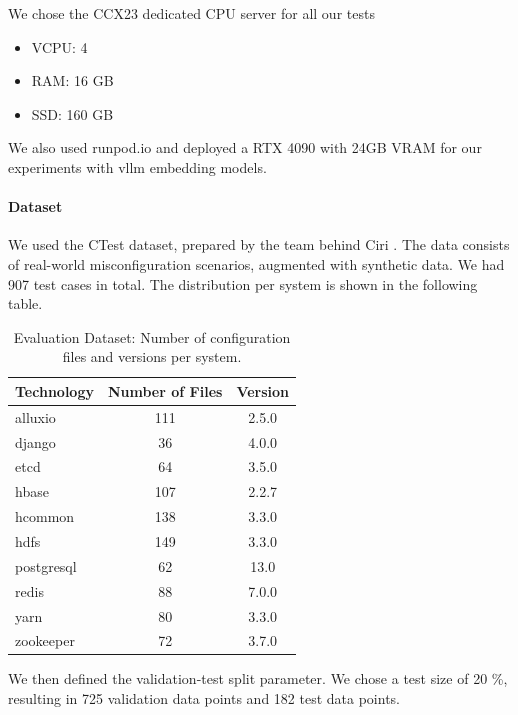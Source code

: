 We chose the CCX23 dedicated CPU server\cite{hetzner-online-gmbh-2025} for all our tests
\begin{itemize}
    \item VCPU: 4
    \item RAM: 16 GB
    \item SSD: 160 GB
\end{itemize}

We also used runpod.io\cite{runpod-2025} and deployed a RTX 4090 with 24GB VRAM for our experiments with vllm \cite{Kwon.12.09.2023} embedding models.

\paragraph{Dataset} 
We used the CTest dataset, prepared by the team behind Ciri \cite{Lian.2024}\cite{xlab-uiuc-2025}. The data consists of real-world misconfiguration scenarios, augmented with synthetic data. We had 907 test cases in total. The distribution per system is shown in the following table.

\begin{table}[h]
    \centering
    \begin{tabular}{|l|c|c|}
        \hline
        \textbf{Technology} & \textbf{Number of Files} & \textbf{Version} \\
        \hline
        alluxio & 111 & 2.5.0 \\
        django & 36 & 4.0.0 \\
        etcd & 64 & 3.5.0 \\
        hbase & 107 & 2.2.7 \\
        hcommon & 138 & 3.3.0 \\
        hdfs & 149 & 3.3.0 \\
        postgresql & 62 & 13.0 \\
        redis & 88 & 7.0.0 \\
        yarn & 80 & 3.3.0 \\
        zookeeper & 72 & 3.7.0 \\
        \hline
    \end{tabular}
    \caption{Evaluation Dataset: Number of configuration files and versions per system.}
    \label{tab:technology_values}
\end{table}

We then defined the validation-test split parameter. We chose a test size of 20 \%, resulting in 725 validation data points and 182 test data points.  

